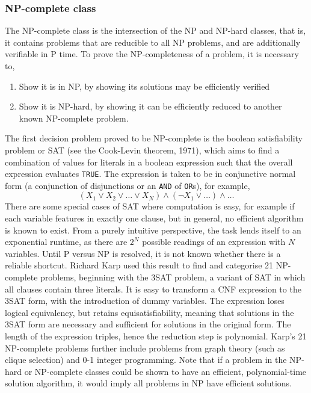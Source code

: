 \documentclass[11pt]{amsart}
\begin{document}
\subsubsection{NP-complete class}

The NP-complete class is the intersection of the NP and NP-hard classes, that is, it contains problems that are reducible to all NP problems, and are additionally verifiable in P time. To prove the NP-completeness of a problem, it is necessary to,

\begin{enumerate}
\item Show it is in NP, by showing its solutions may be efficiently verified
\item Show it is NP-hard, by showing it can be efficiently reduced to another known NP-complete problem.
\end{enumerate}

The first decision problem proved to be NP-complete is the boolean satisfiability problem or SAT (see the Cook-Levin theorem, 1971), which aims to find a combination of values for literals in a boolean expression such that the overall expression evaluates \texttt{TRUE}. The expression is taken to be in conjunctive normal form (a conjunction of disjunctions or an \texttt{AND} of \texttt{OR}s), for example, $$(X_1 \lor X_2 \lor \dots \lor X_N) \land (\neg X_1 \lor \dots) \land \dots$$ There are some special cases of SAT where computation is easy, for example if each variable features in exactly one clause, but in general, no efficient algorithm is known to exist. From a purely intuitive perspective, the task lends itself to an exponential runtime, as there are $2^N$ possible readings of an expression with $N$ variables. Until P versus NP is resolved, it is not known whether there is a reliable shortcut. Richard Karp used this result to find and categorise 21 NP-complete problems, beginning with the 3SAT problem, a variant of SAT in which all clauses contain three literals. It is easy to transform a CNF expression to the 3SAT form, with the introduction of dummy variables. The expression loses logical equivalency, but retains equisatisfiability, meaning that solutions in the 3SAT form are necessary and sufficient for solutions in the original form. The length of the expression triples, hence the reduction step is polynomial. Karp's 21 NP-complete problems further include problems from graph theory (such as clique selection) and 0-1 integer programming. Note that if a problem in the NP-hard or NP-complete classes could be shown to have an efficient, polynomial-time solution algorithm, it would imply all problems in NP have efficient solutions.
\end{document}
